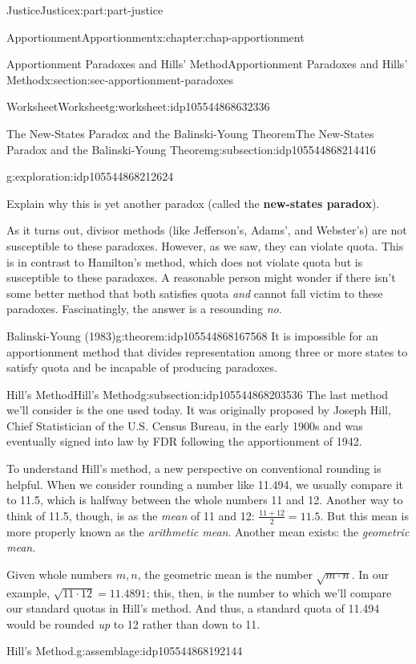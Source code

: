 \documentclass[oneside,10pt,]{book}
\newcommand{\terminology}[1]{\textbf{#1}}
\numberwithin{equation}{section}
\begin{document}
\begin{partptx}{Justice}{}{Justice}{}{}{x:part:part-justice}
\begin{chapterptx}{Apportionment}{}{Apportionment}{}{}{x:chapter:chap-apportionment}
\begin{sectionptx}{Apportionment Paradoxes and Hills' Method}{}{Apportionment Paradoxes and Hills' Method}{}{}{x:section:sec-apportionment-paradoxes}
\begin{worksheet-subsection}{Worksheet}{}{Worksheet}{}{}{g:worksheet:idp105544868632336}
\begin{subsectionptx}{The New-States Paradox and the Balinski-Young Theorem}{}{The New-States Paradox and the Balinski-Young Theorem}{}{}{g:subsection:idp105544868214416}
\begin{exploration}{}{g:exploration:idp105544868212624}
\begin{itemize}[label=\textbullet]
\end{itemize}
Explain why this is yet another paradox (called the \terminology{new-states paradox}).%
\vspace{1.5in}
\end{exploration}%
As it turns out, divisor methods (like Jefferson's, Adams', and Webster's) are not susceptible to these paradoxes. However, as we saw, they can violate quota. This is in contrast to Hamilton's method, which does not violate quota but is susceptible to these paradoxes. A reasonable person might wonder if there isn't some better method that both satisfies quota \emph{and} cannot fall victim to these paradoxes. Fascinatingly, the answer is a resounding \emph{no}.%
\begin{theorem}{}{Balinski-Young (1983)}{g:theorem:idp105544868167568}%
It is impossible for an apportionment method that divides representation among three or more states to satisfy quota and be incapable of producing paradoxes.%
\end{theorem}
\end{subsectionptx}
%
%
\typeout{************************************************}
\typeout{************************************************}
%
\begin{subsectionptx}{Hill's Method}{}{Hill's Method}{}{}{g:subsection:idp105544868203536}
The last method we'll consider is the one used today. It was originally proposed by Joseph Hill, Chief Statistician of the U.S. Census Bureau, in the early 1900s and was eventually signed into law by FDR following the apportionment of 1942.%
\par
To understand Hill's method, a new perspective on conventional rounding is helpful. When we consider rounding a number like 11.494, we usually compare it to 11.5, which is halfway between the whole numbers 11 and 12. Another way to think of 11.5, though, is as the \emph{mean} of 11 and 12: \(\frac{11+12}{2} = 11.5\). But this mean is more properly known as the \emph{arithmetic mean}. Another mean exists: the \emph{geometric mean}.%
\par
Given whole numbers \(m,n\), the geometric mean is the number \(\sqrt{m\cdot n}\). In our example, \(\sqrt{11\cdot 12} = 11.4891\); this, then, is the number to which we'll compare our standard quotas in Hill's method. And thus, a standard quota of 11.494 would be rounded \emph{up} to 12 rather than down to 11.%
\begin{assemblage}{Hill's Method.}{g:assemblage:idp105544868192144}%
%

\end{assemblage}
\end{subsectionptx}
\end{worksheet-subsection}
\end{sectionptx}
\end{chapterptx}
\end{partptx}
\end{document}
